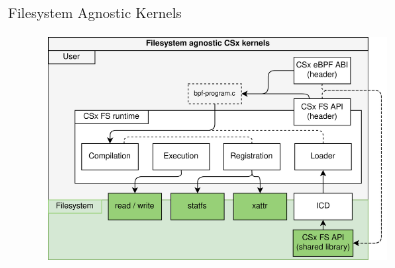 \documentclass{beamer}
\begin{document}
% 
\begin{frame}{Filesystem Agnostic Kernels}
	\begingroup
	\begin{figure}
		\centering
		\includegraphics[width=0.8\textwidth]{resources/images/csx-fs-agnostic.png}
	\end{figure}
	\endgroup
\end{frame}

% 
\end{document}
